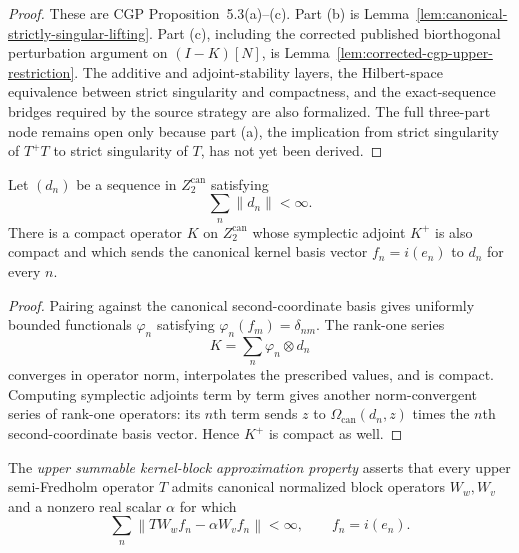 \begin{proof}
These are CGP Proposition~5.3(a)--(c).  Part (b) is
Lemma~\ref{lem:canonical-strictly-singular-lifting}.  Part (c), including the corrected
published biorthogonal perturbation argument on $(I-K)[N]$, is
Lemma~\ref{lem:corrected-cgp-upper-restriction}.  The additive and adjoint-stability layers, the
Hilbert-space equivalence between strict singularity and compactness, and the exact-sequence
bridges required by the source strategy are also formalized.  The full three-part node remains
open only because part (a), the implication from strict singularity of $T^+T$ to strict
singularity of $T$, has not yet been derived.
\end{proof}

\begin{lemma}
\label{lem:compact-biadjoint-kernel-correction}
Let $(d_n)$ be a sequence in $Z_2^{\mathrm{can}}$ satisfying
\[
  \sum_n\lVert d_n\rVert<\infty.
\]
There is a compact operator $K$ on $Z_2^{\mathrm{can}}$ whose symplectic adjoint $K^+$ is also
compact and which sends the canonical kernel basis vector $f_n=i(e_n)$ to $d_n$ for every $n$.
\leanok
\end{lemma}

\begin{proof}
Pairing against the canonical second-coordinate basis gives uniformly bounded functionals
$\varphi_n$ satisfying $\varphi_n(f_m)=\delta_{nm}$.  The rank-one series
\[
  K=\sum_n \varphi_n\otimes d_n
\]
converges in operator norm, interpolates the prescribed values, and is compact.  Computing
symplectic adjoints term by term gives another norm-convergent series of rank-one operators:
its $n$th term sends $z$ to $\Omega_{\mathrm{can}}(d_n,z)$ times the $n$th
second-coordinate basis vector.  Hence $K^+$ is compact as well.
\end{proof}

\begin{definition}
\label{def:upper-summable-kernel-block-approximation}
The \emph{upper summable kernel-block approximation property} asserts that every upper
semi-Fredholm operator $T$ admits canonical normalized block operators $W_w,W_v$ and a nonzero
real scalar $\alpha$ for which
\[
  \sum_n\left\lVert T W_w f_n-\alpha W_v f_n\right\rVert<\infty,
  \qquad f_n=i(e_n).
\]
\leanok
\end{definition}

